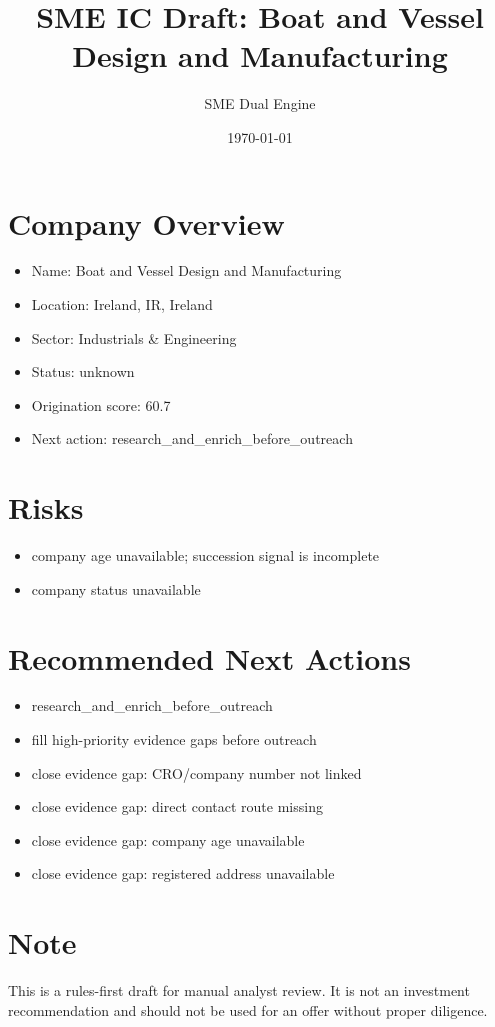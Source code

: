 \documentclass[11pt,a4paper]{article}
\title{SME IC Draft: Boat and Vessel Design and Manufacturing}
\author{SME Dual Engine}
\date{\today}
\begin{document}
\maketitle
\section*{Company Overview}
\begin{itemize}[leftmargin=1.4em]
\item Name: Boat and Vessel Design and Manufacturing
\item Location: Ireland, IR, Ireland
\item Sector: Industrials \& Engineering
\item Status: unknown
\item Origination score: 60.7
\item Next action: research\_and\_enrich\_before\_outreach
\end{itemize}
\section*{Risks}
\begin{itemize}[leftmargin=1.4em]
\item company age unavailable; succession signal is incomplete
\item company status unavailable
\end{itemize}
\section*{Recommended Next Actions}
\begin{itemize}[leftmargin=1.4em]
\item research\_and\_enrich\_before\_outreach
\item fill high-priority evidence gaps before outreach
\item close evidence gap: CRO/company number not linked
\item close evidence gap: direct contact route missing
\item close evidence gap: company age unavailable
\item close evidence gap: registered address unavailable
\end{itemize}
\section*{Note}
This is a rules-first draft for manual analyst review. It is not an investment
recommendation and should not be used for an offer without proper diligence.
\end{document}
